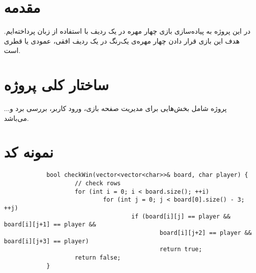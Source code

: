 \newcommand{\coursename}{برنامه سازی پیشرفته}
\newcommand{\projecttitle}{بازی چهار مهره در یک ردیف}
\newcommand{\teachername}{دکتر محمود امین‌طوسی}
\newcommand{\groupmembers}{نام و نام خانوادگی اعضا}
\newcommand{\termname}{بهار ۱۴۰۴}




	
	
	
	\raggedleft
	
	\newpage
	
	\tableofcontents
	
	\newpage
	
	
	\section{مقدمه}
	در این پروژه به پیاده‌سازی بازی چهار مهره در یک ردیف  با استفاده از زبان  پرداخته‌ایم. هدف این بازی قرار دادن چهار مهره‌ی یک‌رنگ در یک ردیف افقی، عمودی یا قطری است.
	
	\section{ساختار کلی پروژه}
	پروژه شامل بخش‌هایی برای مدیریت صفحه بازی، ورود کاربر، بررسی برد و... می‌باشد.
	
	\section{نمونه کد}
	\begin{latin}
		\begin{verbatim}
			bool checkWin(vector<vector<char>>& board, char player) {
					// check rows
					for (int i = 0; i < board.size(); ++i)
							for (int j = 0; j < board[0].size() - 3; ++j)
									if (board[i][j] == player && board[i][j+1] == player &&
											board[i][j+2] == player && board[i][j+3] == player)
											return true;
					return false;
			}
		\end{verbatim}
	\end{latin}
	
	

